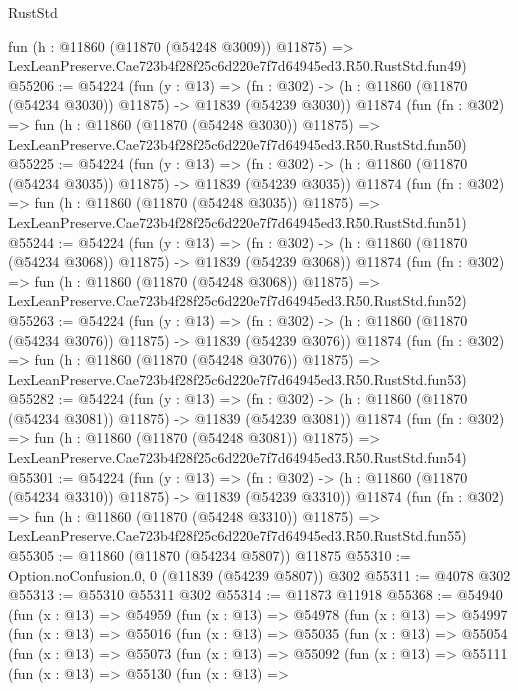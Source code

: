 \begin{lexlean}{RustStd}
\begin{coremodule}
    fun (h : @11860 (@11870 (@54248 @3009)) @11875) =>
    LexLeanPreserve.Cae723b4f28f25c6d220e7f7d64945ed3.R50.RustStd.fun49)
@55206 := @54224
    (fun (y : @13) =>
    (fn : @302) -> (h : @11860 (@11870 (@54234 @3030)) @11875) -> @11839 (@54239 @3030))
    @11874
    (fun (fn : @302) =>
    fun (h : @11860 (@11870 (@54248 @3030)) @11875) =>
    LexLeanPreserve.Cae723b4f28f25c6d220e7f7d64945ed3.R50.RustStd.fun50)
@55225 := @54224
    (fun (y : @13) =>
    (fn : @302) -> (h : @11860 (@11870 (@54234 @3035)) @11875) -> @11839 (@54239 @3035))
    @11874
    (fun (fn : @302) =>
    fun (h : @11860 (@11870 (@54248 @3035)) @11875) =>
    LexLeanPreserve.Cae723b4f28f25c6d220e7f7d64945ed3.R50.RustStd.fun51)
@55244 := @54224
    (fun (y : @13) =>
    (fn : @302) -> (h : @11860 (@11870 (@54234 @3068)) @11875) -> @11839 (@54239 @3068))
    @11874
    (fun (fn : @302) =>
    fun (h : @11860 (@11870 (@54248 @3068)) @11875) =>
    LexLeanPreserve.Cae723b4f28f25c6d220e7f7d64945ed3.R50.RustStd.fun52)
@55263 := @54224
    (fun (y : @13) =>
    (fn : @302) -> (h : @11860 (@11870 (@54234 @3076)) @11875) -> @11839 (@54239 @3076))
    @11874
    (fun (fn : @302) =>
    fun (h : @11860 (@11870 (@54248 @3076)) @11875) =>
    LexLeanPreserve.Cae723b4f28f25c6d220e7f7d64945ed3.R50.RustStd.fun53)
@55282 := @54224
    (fun (y : @13) =>
    (fn : @302) -> (h : @11860 (@11870 (@54234 @3081)) @11875) -> @11839 (@54239 @3081))
    @11874
    (fun (fn : @302) =>
    fun (h : @11860 (@11870 (@54248 @3081)) @11875) =>
    LexLeanPreserve.Cae723b4f28f25c6d220e7f7d64945ed3.R50.RustStd.fun54)
@55301 := @54224
    (fun (y : @13) =>
    (fn : @302) -> (h : @11860 (@11870 (@54234 @3310)) @11875) -> @11839 (@54239 @3310))
    @11874
    (fun (fn : @302) =>
    fun (h : @11860 (@11870 (@54248 @3310)) @11875) =>
    LexLeanPreserve.Cae723b4f28f25c6d220e7f7d64945ed3.R50.RustStd.fun55)
@55305 := @11860 (@11870 (@54234 @5807)) @11875
@55310 := Option.noConfusion.{0, 0} (@11839 (@54239 @5807)) @302
@55311 := @4078 @302
@55313 := @55310 @55311 @302
@55314 := @11873 @11918
@55368 := @54940
    (fun (x : @13) =>
    @54959
      (fun (x : @13) =>
      @54978
        (fun (x : @13) =>
        @54997
          (fun (x : @13) =>
          @55016
            (fun (x : @13) =>
            @55035
              (fun (x : @13) =>
              @55054
                (fun (x : @13) =>
                @55073
                  (fun (x : @13) =>
                  @55092
                    (fun (x : @13) =>
                    @55111
                      (fun (x : @13) =>
                      @55130
                        (fun (x : @13) =>

\end{coremodule}
\end{lexlean}
